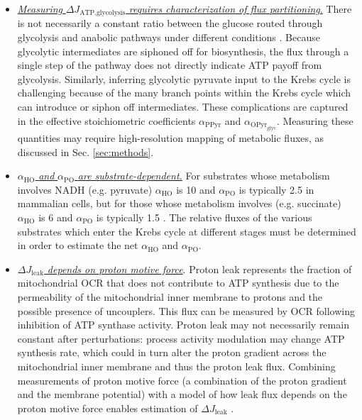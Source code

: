 \documentclass{compactarticle}
\begin{document}
\begin{itemize}
    
    \item \underline{\textit{Measuring} $\Delta J_\text{ATP,glycolysis}$ \textit{requires characterization of flux partitioning}.} There is not necessarily a constant ratio between the glucose routed through glycolysis and anabolic pathways under different conditions \cite{frick2005characterization,mitsuishi2012nrf2}. Because glycolytic intermediates are siphoned off for biosynthesis, the flux through a single step of the pathway does not directly indicate ATP payoff from glycolysis. Similarly, inferring glycolytic pyruvate input to the Krebs cycle is challenging because of the many branch points within the Krebs cycle which can introduce or siphon off intermediates. These complications are captured in the effective stoichiometric coefficients $\alpha_\text{PPyr}$ and $ \alpha_{\text{O}\text{Pyr}_{\text{glyc}}}$. Measuring these quantities may require high-resolution mapping of metabolic fluxes, as discussed in Sec. \ref{sec:methods}.
    
    \item \underline{$\alpha_\text{HO}$ \textit{ and } $\alpha_\text{PO}$ \textit{are substrate-dependent.}} For substrates whose metabolism involves NADH (e.g. pyruvate) $\alpha_\text{HO}$ is 10 and $\alpha_\text{PO}$ is typically 2.5 in mammalian cells, but for those whose metabolism involves  (e.g. succinate) $\alpha_\text{HO}$ is 6 and $\alpha_\text{PO}$ is typically 1.5 \cite{hinkle2005p,hinkle1991,brand1995}. The relative fluxes of the various substrates which enter the Krebs cycle at different stages must be determined in order to estimate the net $\alpha_\text{HO}$ and $\alpha_\text{PO}$.
    
    \item \underline{$\Delta J_\text{leak}$ \textit{depends on proton motive force}}. Proton leak represents the fraction of mitochondrial OCR that does not contribute to ATP synthesis due to the permeability of the mitochondrial inner membrane to protons and the possible presence of uncouplers. This flux can be measured by OCR following inhibition of ATP synthase activity. Proton leak may not necessarily remain constant after perturbations: process activity modulation may change ATP synthesis rate, which could in turn alter the proton gradient across the mitochondrial inner membrane and thus the proton leak flux. Combining measurements of proton motive force (a combination of the proton gradient and the membrane potential) with a model of how leak flux depends on the proton motive force enables estimation of $\Delta J_\text{leak}$ \cite{divakaruni2011}.
    

\end{itemize}
\end{document}
